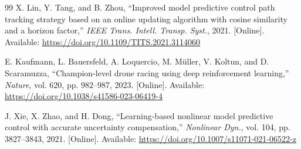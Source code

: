 \begin{thebibliography}{99}
X. Lin, Y. Tang, and B. Zhou, ``Improved model predictive control path tracking strategy based on an online updating algorithm with cosine similarity and a horizon factor,'' \emph{IEEE Trans. Intell. Transp. Syst.}, 2021. [Online]. Available: \url{https://doi.org/10.1109/TITS.2021.3114060}

E. Kaufmann, L. Bauersfeld, A. Loquercio, M. M\"uller, V. Koltun, and D. Scaramuzza, ``Champion-level drone racing using deep reinforcement learning,'' \emph{Nature}, vol. 620, pp. 982--987, 2023. [Online]. Available: \url{https://doi.org/10.1038/s41586-023-06419-4}

J. Xie, X. Zhao, and H. Dong, ``Learning-based nonlinear model predictive control with accurate uncertainty compensation,'' \emph{Nonlinear Dyn.}, vol. 104, pp. 3827--3843, 2021. [Online]. Available: \url{https://doi.org/10.1007/s11071-021-06522-z}

\end{thebibliography}

